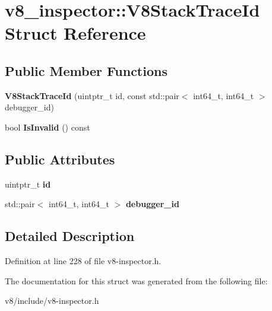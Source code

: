 \hypertarget{structv8__inspector_1_1V8StackTraceId}{}\section{v8\+\_\+inspector\+:\+:V8\+Stack\+Trace\+Id Struct Reference}
\label{structv8__inspector_1_1V8StackTraceId}
\subsection*{Public Member Functions}
\begin{DoxyCompactItemize}
\item 
\mbox{\label{structv8__inspector_1_1V8StackTraceId_a229d85e0a584d86a881b6ef575b1a9a2}} 
{\bfseries V8\+Stack\+Trace\+Id} (uintptr\+\_\+t id, const std\+::pair$<$ int64\+\_\+t, int64\+\_\+t $>$ debugger\+\_\+id)
\item 
\mbox{\label{structv8__inspector_1_1V8StackTraceId_a20fd4c6fe649f6663b7855f38681a211}} 
bool {\bfseries Is\+Invalid} () const
\end{DoxyCompactItemize}
\subsection*{Public Attributes}
\begin{DoxyCompactItemize}
\item 
\mbox{\label{structv8__inspector_1_1V8StackTraceId_ad9e65194b2f95f1a9b98fdc76af8dae2}} 
uintptr\+\_\+t {\bfseries id}
\item 
\mbox{\label{structv8__inspector_1_1V8StackTraceId_aa64ad33eb9a49a373f87aaa5e0964500}} 
std\+::pair$<$ int64\+\_\+t, int64\+\_\+t $>$ {\bfseries debugger\+\_\+id}
\end{DoxyCompactItemize}


\subsection{Detailed Description}


Definition at line 228 of file v8-\/inspector.\+h.



The documentation for this struct was generated from the following file\+:\begin{DoxyCompactItemize}
\item 
v8/include/v8-\/inspector.\+h\end{DoxyCompactItemize}
